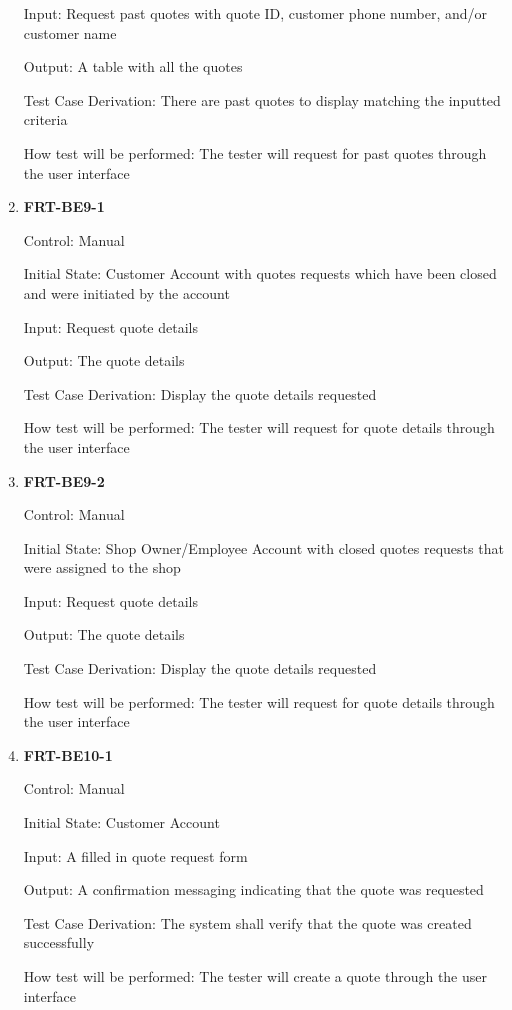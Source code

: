 \documentclass[12pt, titlepage]{article}
\begin{document}
\begin{enumerate}
	      Input: Request past quotes with quote ID, customer phone number, and/or customer name

	      Output: A table with all the quotes

	      Test Case Derivation: There are past quotes to display matching the inputted criteria

	      How test will be performed: The tester will request for past quotes through the user interface

	\item \textbf{FRT-BE9-1}

	      Control: Manual

	      Initial State: Customer Account with quotes requests which have been closed and were initiated by
	      the account

	      Input: Request quote details

	      Output: The quote details

	      Test Case Derivation: Display the quote details requested

	      How test will be performed: The tester will request for quote details through the user interface

	\item \textbf{FRT-BE9-2}

	      Control: Manual

	      Initial State: Shop Owner/Employee Account with closed quotes requests that were assigned to the
	      shop

	      Input: Request quote details

	      Output: The quote details

	      Test Case Derivation: Display the quote details requested

	      How test will be performed: The tester will request for quote details through the user interface

	\item \textbf{FRT-BE10-1}

	      Control: Manual

	      Initial State: Customer Account

	      Input: A filled in quote request form

	      Output: A confirmation messaging indicating that the quote was requested

	      Test Case Derivation: The system shall verify that the quote was created successfully

	      How test will be performed: The tester will create a quote through the user interface


\end{enumerate}
\end{document}
